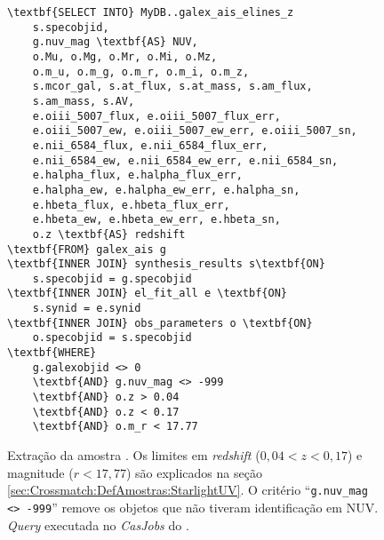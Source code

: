 \begin{figure}
\begin{Verbatim}[frame=single,commandchars=\\\{\}]
\textbf{SELECT INTO} MyDB..galex_ais_elines_z
	s.specobjid,
	g.nuv_mag \textbf{AS} NUV,
	o.Mu, o.Mg, o.Mr, o.Mi, o.Mz,
	o.m_u, o.m_g, o.m_r, o.m_i, o.m_z,
	s.mcor_gal, s.at_flux, s.at_mass, s.am_flux,
	s.am_mass, s.AV,
	e.oiii_5007_flux, e.oiii_5007_flux_err,
	e.oiii_5007_ew, e.oiii_5007_ew_err, e.oiii_5007_sn,
	e.nii_6584_flux, e.nii_6584_flux_err,
	e.nii_6584_ew, e.nii_6584_ew_err, e.nii_6584_sn,
	e.halpha_flux, e.halpha_flux_err,
	e.halpha_ew, e.halpha_ew_err, e.halpha_sn,
	e.hbeta_flux, e.hbeta_flux_err,
	e.hbeta_ew, e.hbeta_ew_err, e.hbeta_sn,
	o.z \textbf{AS} redshift
\textbf{FROM} galex_ais g
\textbf{INNER JOIN} synthesis_results s\textbf{ON}
	s.specobjid = g.specobjid
\textbf{INNER JOIN} el_fit_all e \textbf{ON}
	s.synid = e.synid
\textbf{INNER JOIN} obs_parameters o \textbf{ON}
	o.specobjid = s.specobjid
\textbf{WHERE}
	g.galexobjid <> 0
	\textbf{AND} g.nuv_mag <> -999
	\textbf{AND} o.z > 0.04
	\textbf{AND} o.z < 0.17
	\textbf{AND} o.m_r < 17.77
\end{Verbatim}
	\caption[Extração da amostra \starlightUV.]
	{Extração da amostra \starlightUV. Os limites em {\em redshift}
	($0,04 < z < 0,17$) e magnitude ($r<17,77$) são explicados na seção
	\ref{sec:Crossmatch:DefAmostras:StarlightUV}. O critério ``\texttt{g.nuv\_mag
	<> -999}'' remove os objetos que não tiveram identificação em NUV. {\em Query}
	executada no {\em CasJobs} do \starlight.}
	\label{fig:QuerySampleAIS}
\end{figure}


